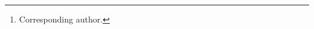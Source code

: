 \author{
    Rui Wang\textsuperscript{1} \quad
    Huisi Wu\textsuperscript{1}\thanks{Corresponding author.} \quad
    Jing Qin\textsuperscript{2}
    \\
    {\small \textsuperscript{1}College of Computer Science and Software Engineering, Shenzhen University} \\
    {\small \textsuperscript{2}Centre for Smart Health, School of Nursing, The Hong Kong Polytechnic University} \\
    {\small \href{mailto:2400101058@mails.szu.edu.cn}{\nolinkurl{2400101058@mails.szu.edu.cn}}, \href{mailto:hswu@szu.edu.cn}{\nolinkurl{hswu@szu.edu.cn}}}
}